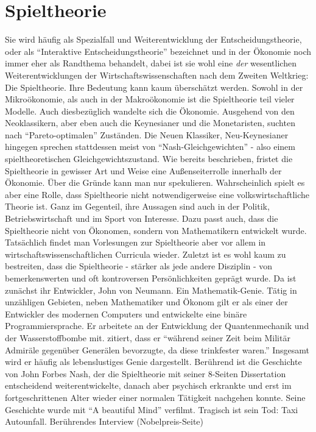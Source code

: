 %
%
%

\chapter{Spieltheorie} \label{cha: Spieltheorie}
\label{Spieltheorie}

Sie wird häufig als Spezialfall und Weiterentwicklung der Entscheidungstheorie, oder als "`Interaktive Entscheidungstheorie"' bezeichnet und in der Ökonomie noch immer eher als Randthema behandelt, dabei ist sie wohl eine \textit{der} wesentlichen Weiterentwicklungen der Wirtschaftswissenschaften nach dem Zweiten Weltkrieg: Die Spieltheorie. Ihre Bedeutung kann kaum überschätzt werden. Sowohl in der Mikroökonomie, als auch in der Makroökonomie ist die Spieltheorie teil vieler Modelle. Auch diesbezüglich wandelte sich die Ökonomie. Ausgehend von den Neoklassikern, aber eben auch die Keynesianer und die Monetaristen, suchten nach "`Pareto-optimalen"' Zuständen. Die Neuen Klassiker, Neu-Keynesianer hingegen sprechen stattdessen meist von "`Nash-Gleichgewichten"' - also einem spieltheoretischen Gleichgewichtszustand. Wie bereits beschrieben, fristet die Spieltheorie in gewisser Art und Weise eine Außenseiterrolle innerhalb der Ökonomie. Über die Gründe kann man nur spekulieren. Wahrscheinlich spielt es aber eine Rolle, dass Spieltheorie nicht notwendigerweise eine volkswirtschaftliche Theorie ist. Ganz im Gegenteil, ihre Aussagen sind auch in der Politik, Betriebswirtschaft und im Sport von Interesse. Dazu passt auch, dass die Spieltheorie nicht von Ökonomen, sondern von Mathematikern entwickelt wurde. Tatsächlich findet man Vorlesungen zur Spieltheorie aber vor allem in wirtschaftswissenschaftlichen Curricula wieder. Zuletzt ist es wohl kaum zu bestreiten, dass die Spieltheorie - stärker als jede andere Disziplin - von bemerkenswerten und oft kontroversen Persönlichkeiten geprägt wurde. Da ist zunächst ihr Entwickler, John von Neumann. Ein Mathematik-Genie. Tätig in unzähligen Gebieten, neben Mathematiker und Ökonom gilt er als einer der Entwickler des modernen Computers und entwickelte eine binäre Programmiersprache. Er arbeitete an der Entwicklung der Quantenmechanik und der Wasserstoffbombe mit. \textcite[S. 232]{Bernstein1996} zitiert, dass er "`während seiner Zeit beim Militär Admiräle gegenüber Generälen bevorzugte, da diese trinkfester waren."' Insgesamt wird er häufig als lebenslustiges Genie dargestellt. Berührend ist die Geschichte von John Forbes Nash, der die Spieltheorie mit seiner 8-Seiten Dissertation entscheidend weiterentwickelte, danach aber psychisch erkrankte und erst im fortgeschrittenen Alter wieder einer normalen Tätigkeit nachgehen konnte. Seine Geschichte wurde mit "`A beautiful Mind"' verfilmt. Tragisch ist sein Tod: Taxi Autounfall. Berührendes Interview (Nobelpreis-Seite)


